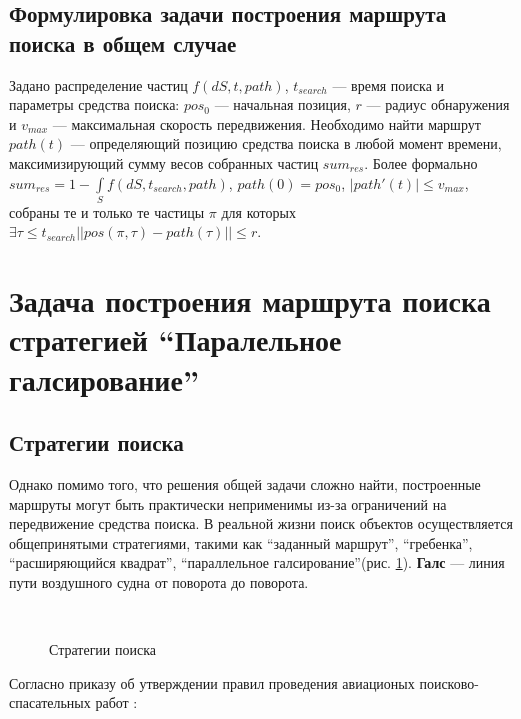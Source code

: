 \FloatBarrier
\subsection{Формулировка задачи построения маршрута поиска 
в общем случае}
Задано распределение частиц $f(dS, t, path)$, $t_{search}$ --- время поиска
и параметры средства поиска: $pos_0$ --- начальная позиция, $r$ --- радиус обнаружения и 
$v_{max}$ --- максимальная скорость передвижения.
 Необходимо найти маршрут $path(t)$ --- определяющий
позицию средства поиска в любой момент времени, максимизирующий сумму весов собранных
частиц $sum_{res}$.
Более формально $sum_{res}=1-\int\limits_Sf(dS, t_{search}, path)$, $path(0)=pos_0$,
 $|path'(t)|\le v_{max}$, собраны те и только те частицы
 $\pi$ для которых $\exists \tau\le t_{search} ||pos(\pi, \tau)-path(\tau)|| \le r$. 
\FloatBarrier
\section{Задача построения маршрута поиска
 стратегией ``Паралельное галсирование''}

\subsection{Стратегии поиска}
Однако помимо того, что решения общей задачи сложно найти, построенные маршруты могут быть
практически неприменимы из-за ограничений на передвижение средства поиска. В реальной жизни
поиск объектов осуществляется общепринятыми стратегиями, такими как ``заданный маршрут'',
``гребенка'', ``расширяющийся квадрат'',
``параллельное галсирование''(рис. \ref{strat:subfigures}).
\textbf{Галс} --- линия пути воздушного судна от поворота до поворота.
\begin{figure}[ht]
  \begin{center}
    \\
  \end{center}
 \caption{Стратегии поиска}
 \label{strat:subfigures}
\end{figure}

Согласно приказу об утверждении правил проведения авиационых поисково-спасательных работ
\cite{napss90}:

